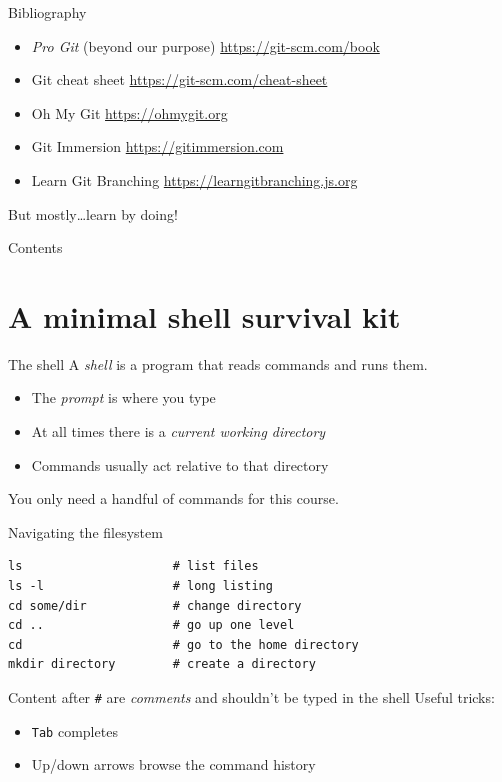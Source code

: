 \documentclass[11pt]{beamer}
\begin{document}
\begin{frame}{Bibliography}
  \begin{itemize}
    \item \emph{Pro Git} (beyond our purpose) \url{https://git-scm.com/book}
    \item Git cheat sheet \url{https://git-scm.com/cheat-sheet}
    \item Oh My Git \url{https://ohmygit.org}
    \item Git Immersion \url{https://gitimmersion.com}
    \item Learn Git Branching \url{https://learngitbranching.js.org}
    \end{itemize}

    \vfill

    But mostly\ldots learn by doing!
\end{frame}

\begin{frame}{Contents}
  \tableofcontents
\end{frame}




\section{A minimal shell survival kit}

\begin{frame}{The shell}
  A \emph{shell} is a program that reads commands and runs them.
  \begin{itemize}
    \item The \emph{prompt} is where you type
    \item At all times there is a \emph{current working directory}
    \item Commands usually act relative to that directory
  \end{itemize}
  \vfill
  You only need a handful of commands for this course.
\end{frame}

\begin{frame}[fragile]{Navigating the filesystem}
\begin{lstlisting}
ls                     # list files
ls -l                  # long listing
cd some/dir            # change directory
cd ..                  # go up one level
cd                     # go to the home directory
mkdir directory        # create a directory
\end{lstlisting}
\vfill
Content after \texttt{\#} are \emph{comments} and shouldn't be typed in
the shell
  \vfill
  Useful tricks:
  \begin{itemize}
    \item \texttt{Tab} completes
    \item Up/down arrows browse the command history
  \end{itemize}
\end{frame}
\end{document}
